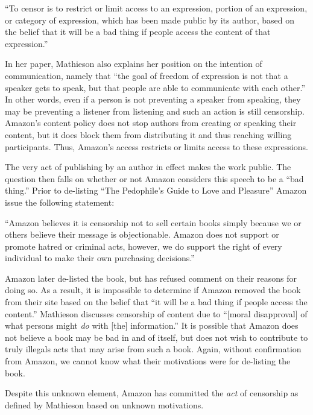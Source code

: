 \documentclass[11pt]{article}
\begin{document}
\begin{multicols}{2}
``To censor is to restrict or limit access to an expression, portion of an expression, or category of expression, which has been made public by its author, based on the belief that it will be a bad thing if people access the content of that expression.'' \cite{MathiesenCensorship}

In her paper, Mathieson also explains her position on the intention of communication, namely that ``the goal of freedom of expression is not that a speaker gets to speak, but that people are able to communicate with each other.''  In other words, even if a person is not preventing a speaker from speaking, they may be preventing a listener from listening and such an action is still censorship.  Amazon's content policy does not stop authors from creating or speaking their content, but it does block them from distributing it and thus reaching willing participants.  Thus, Amazon's access restricts or limits access to these expressions.

The very act of publishing by an author in effect makes the work public.  The question then falls on whether or not Amazon considers this speech to be a ``bad thing.''  Prior to de-listing ``The Pedophile's Guide to Love and Pleasure'' Amazon issue the following statement:

``Amazon believes it is censorship not to sell certain books simply because we or others believe their message is objectionable.  Amazon does not support or promote hatred or criminal acts, however, we do support the right of every individual to make their own purchasing decisions.'' \cite{TechCrunchAmazonCensorship}

Amazon later de-listed the book, but has refused comment on their reasons for doing so.  As a result, it is impossible to determine if Amazon removed the book from their site based on the belief that ``it will be a bad thing if people access the content.''  Mathieson discusses censorship of content due to ``[moral disapproval] of what persons might \emph{do} with [the] information.'' \cite{MathiesenCensorship}  It is possible that Amazon does not believe a book may be bad in and of itself, but does not wish to contribute to truly illegals acts that may arise from such a book.  Again, without confirmation from Amazon, we cannot know what their motivations were for de-listing the book.

Despite this unknown element, Amazon has committed the \emph{act} of censorship as defined by Mathieson based on unknown motivations.


\end{multicols}
\end{document}
